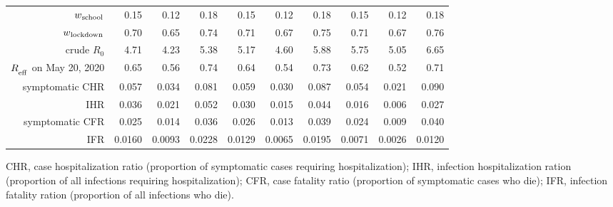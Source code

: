 \documentclass[11pt]{article}
\begin{document}
\begin{table}[!htb]
\begin{tabular}{r|rrr|rrr|rrr}
				$w\textsubscript{school}$ & 0.15 & 0.12 & 0.18 & 0.15 & 0.12 & 0.18 & 0.15 & 0.12 & 0.18 \\ 
				$w\textsubscript{lockdown}$ & 0.70 & 0.65 & 0.74 & 0.71 & 0.67 & 0.75 & 0.71 & 0.67 & 0.76 \\ 
				crude $R_0$ & 4.71 & 4.23 & 5.38 & 5.17 & 4.60 & 5.88 & 5.75 & 5.05 & 6.65 \\ 
				$R_\textsubscript{eff}$ on May 20, 2020 & 0.65 & 0.56 & 0.74 & 0.64 & 0.54 & 0.73 & 0.62 & 0.52 & 0.71 \\ 
				symptomatic CHR & 0.057 & 0.034 & 0.081 & 0.059 & 0.030 & 0.087 & 0.054 & 0.021 & 0.090 \\ 
				IHR & 0.036 & 0.021 & 0.052 & 0.030 & 0.015 & 0.044 & 0.016 & 0.006 & 0.027 \\ 
				symptomatic CFR & 0.025 & 0.014 & 0.036 & 0.026 & 0.013 & 0.039 & 0.024 & 0.009 & 0.040 \\ 
				IFR & 0.0160 & 0.0093 & 0.0228 & 0.0129 & 0.0065 & 0.0195 & 0.0071 & 0.0026 & 0.0120 \\ 
		\bottomrule 
	\end{tabular}
	\vspace{0.5em}
	
	{\raggedright CHR, case hospitalization ratio (proportion of symptomatic cases requiring hospitalization); IHR, infection hospitalization ration (proportion of all infections requiring hospitalization);
		          CFR, case fatality ratio (proportion of symptomatic cases who die); IFR, infection fatality ration (proportion of all infections who die). \par}
	\label{tbl:posterior}
\end{table}



\end{document}

